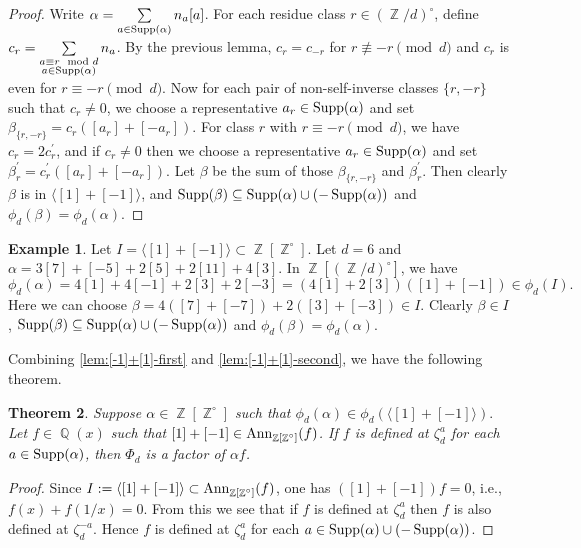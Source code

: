 \documentclass[12t,a4paper]{amsart}
\newtheorem{thm}{Theorem}[section]
\theoremstyle{definition}
\newtheorem{expl}[thm]{Example}
\DeclareMathOperator{\Z}{\mathbb{Z}}
\DeclareMathOperator{\Q}{\mathbb{Q}}
\DeclareMathOperator{\supp}{{\rm Supp}}
\newcommand{\Ann}{{\rm Ann}}
\numberwithin{equation}{section}
\begin{document}
{     \begin{proof} Write $\alpha=\sum\limits_{a\in \supp(\alpha)} n_a[a]$.  For each residue class $r\in (\Z/d)^\circ$, define $c_r=\sum\limits_{\substack{a\equiv r\mod d\\ a\in \supp(\alpha)}}n_a$. By the previous lemma, $c_r=c_{-r}$ for $r\not\equiv -r\pmod d$ and $c_r$ is even for $r\equiv -r\pmod d$. 
     Now for each pair of non-self-inverse classes $\{r,-r\}$ such that $c_r\not=0$, we choose a representative $a_r\in \supp(\alpha)$ and set $\beta_{\{r,-r\}}= c_r([a_r]+[-a_r])$. For class $r$ with $r\equiv-r\pmod d$, we have $c_r=2 c^\prime_ r$, and if $c_r\not=0$ then we choose a representative $a_r\in \supp(\alpha)$ and set $\beta^\prime_{r}= c^\prime_r ([a_r]+[-a_r])$. Let $\beta$ be the sum of those $\beta_{\{r,-r\}}$ and $\beta^\prime_r$. Then clearly $\beta$ is in $\langle [1] + [-1] \rangle$, and $\supp(\beta)\subseteq \supp(\alpha)\cup(-\supp(\alpha))$ and $\phi_d(\beta)=\phi_d(\alpha)$. 
     \end{proof}
     \begin{expl}
         Let $I = \langle [1] + [-1] \rangle \subset \Z[\Z^{\circ}]$. Let $d=6$  and $\alpha=3[7]+[-5] + 2[5]+2[11] +4[3]$. In $\Z[(\Z/d)^\circ]$, we have
         \[\phi_d(\alpha)= 4[1]+4[-1] +2[3]+2[-3]= (4[1]+2[3]) ([1]+[-1])\in \phi_d(I).
         \]
         Here we can choose $\beta=4([7]+[-7])+2([3]+[-3])\in I$. Clearly $\beta\in I$, $\supp(\beta)\subseteq \supp(\alpha)\cup(-\supp(\alpha))$ and $\phi_d(\beta)=\phi_d(\alpha)$.
     \end{expl}

Combining \cref{lem:[-1]+[1]-first} and \cref{lem:[-1]+[1]-second}, we have the following theorem.  
\begin{thm} \label{thm:mahler-congruence}
    Suppose $\alpha \in \Z[\Z^{\circ}]$ such that $\phi_d(\alpha) \in \phi_d(\langle [1] + [-1] \rangle).$ Let $f \in \Q(x)$ such that $[1] + [-1] \in \Ann_{\Z[\Z^{\circ}]}(f)$. If $f$ is defined at $\zeta_d^a$ for each $a \in \supp(\alpha)$, then $\Phi_d$ is a factor of $\alpha f$. 
\end{thm}
\begin{proof}
    Since $I:=\langle [1] + [-1] \rangle \subset \Ann_{\Z[\Z^{\circ}]}(f)$, one has $([1]+[-1])f=0$, i.e., $f(x)+f(1/x)=0$. From this we see that if $f$ is defined at $\zeta_d^a$  then $f$ is also defined at $\zeta_d^{-a}$. Hence $f$ is defined at $\zeta_d^a$ for each $a\in \supp(\alpha)\cup(-\supp(\alpha))$.


\end{proof}}
\end{document}
